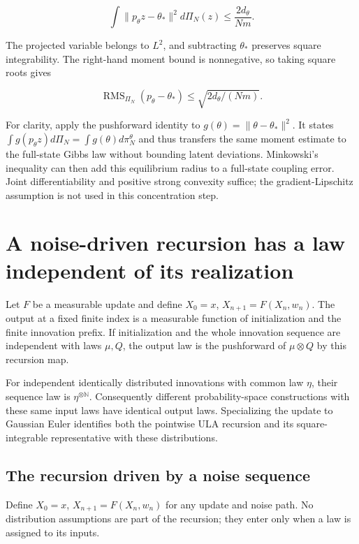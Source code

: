 \documentclass[11pt,a4paper]{article}
\begin{document}
\[\int\|p_\theta z-\theta_*\|^2d\Pi_N(z)\le\frac{2d_\theta}{Nm}.\]

The projected variable belongs to \(L^2\), and subtracting \(\theta_*\) preserves square integrability. The right-hand moment bound is nonnegative, so taking square roots gives

\[\operatorname{RMS}_{\Pi_N}(p_\theta-\theta_*)\le\sqrt{2d_\theta/(Nm)}.\]

For clarity, apply the pushforward identity to \(g(\theta)=\|\theta-\theta_*\|^2\). It states \(\int g(p_\theta z)d\Pi_N=\int g(\theta)d\pi_N^\theta\) and thus transfers the same moment estimate to the full-state Gibbs law without bounding latent deviations. Minkowski’s inequality can then add this equilibrium radius to a full-state coupling error. Joint differentiability and positive strong convexity suffice; the gradient-Lipschitz assumption is not used in this concentration step.




\section{\texorpdfstring{A noise-driven recursion has a law independent of its realization}{A noise-driven recursion has a law independent of its realization}}


Let \(F\) be a measurable update and define \(X_0=x\), \(X_{n+1}=F(X_n,w_n)\). The output at a fixed finite index is a measurable function of initialization and the finite innovation prefix. If initialization and the whole innovation sequence are independent with laws \(\mu,Q\), the output law is the pushforward of \(\mu\otimes Q\) by this recursion map.



For independent identically distributed innovations with common law \(\eta\), their sequence law is \(\eta^{\otimes\mathbb N}\). Consequently different probability-space constructions with these same input laws have identical output laws. Specializing the update to Gaussian Euler identifies both the pointwise ULA recursion and its square-integrable representative with these distributions.


\subsection{\texorpdfstring{The recursion driven by a noise sequence}{The recursion driven by a noise sequence}}


Define \(X_0=x\), \(X_{n+1}=F(X_n,w_n)\) for any update and noise path. No distribution assumptions are part of the recursion; they enter only when a law is assigned to its inputs.
\end{document}
